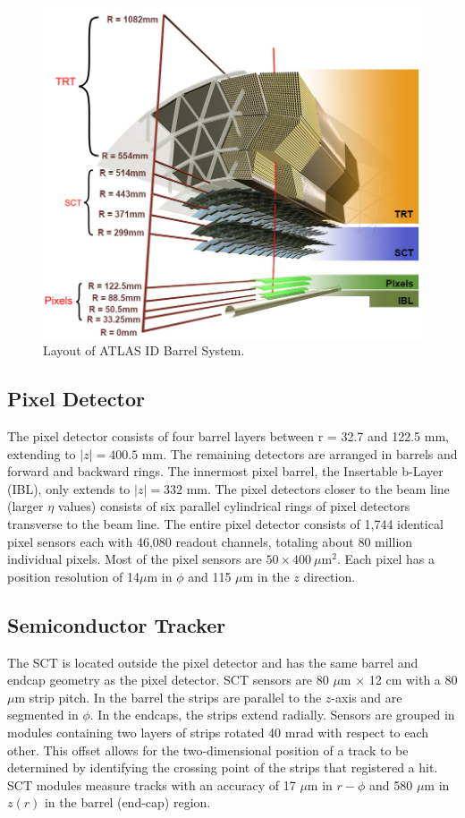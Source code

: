 \begin{figure}[h!]
  \centering
  \includegraphics[width=\hsize]{figures/Detector/tracker_barrel.png}
  \caption{Layout of ATLAS ID Barrel System.} 
  \label{fig:barrelID}
\end{figure}
\FloatBarrier


\subsection{Pixel Detector}
The pixel detector consists of four barrel layers between r = 32.7 and 122.5 mm, extending to $|z|=400.5$ mm. The remaining detectors are arranged in barrels and forward and backward rings. The innermost pixel barrel, the Insertable b-Layer (IBL), only extends to $|z|=332$ mm. The pixel detectors closer to the beam line (larger $\eta$ values) consists of six parallel cylindrical rings of pixel detectors transverse to the beam line. The entire pixel detector consists of 1,744 identical pixel sensors each with 46,080 readout channels, totaling about 80 million individual pixels. Most of the pixel sensors are $50\times400~\mu$m$^{2}$.  Each pixel has a position resolution of 14$\mu$m in $\phi$ and 115 $\mu$m in the $z$ direction.
\subsection{Semiconductor Tracker}
The SCT is located outside the pixel detector and has the same barrel and endcap geometry as the pixel detector. SCT sensors are 80 $\mu$m $\times$ 12 cm with a 80$\mu$m strip pitch. In the barrel the strips are parallel to the $z$-axis and are segmented in $\phi$. In the endcaps, the strips extend radially. Sensors are grouped in modules containing two layers of strips rotated 40 mrad with respect to each other. This offset allows for the two-dimensional position of a track to be determined by identifying the crossing point of the strips that registered a hit. SCT modules measure tracks with an accuracy of 17 $\mu$m in $r-\phi$ and 580 $\mu$m in $z(r)$ in the barrel (end-cap) region.

